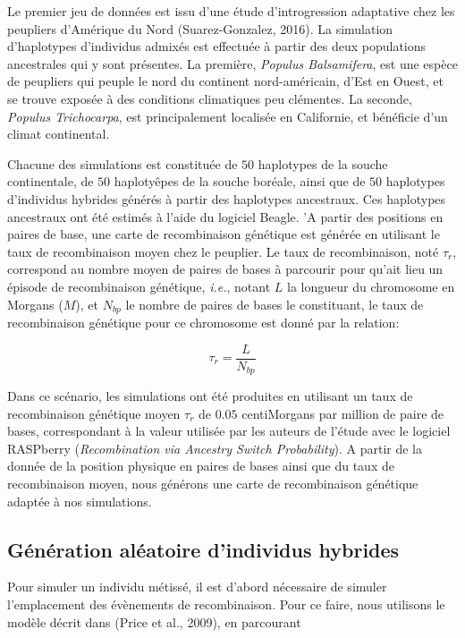 \documentclass[12pt,twoside]{reedthesis}
\begin{document}
  Le premier jeu de données est issu d'une étude d'introgression
  adaptative chez les peupliers d'Amérique du Nord (Suarez-Gonzalez,
  2016). La simulation d'haplotypes d'individus admixés est effectuée à
  partir des deux populations ancestrales qui y sont présentes. La
  première, \emph{Populus Balsamifera}, est une espèce de peupliers qui
  peuple le nord du continent nord-américain, d'Est en Ouest, et se trouve
  exposée à des conditions climatiques peu clémentes. La seconde,
  \emph{Populus Trichocarpa}, est principalement localisée en Californie,
  et bénéficie d'un climat continental.
  
  Chacune des simulations est constituée de \(50\) haplotypes de la souche
  continentale, de \(50\) haplotyêpes de la souche boréale, ainsi que de
  \(50\) haplotypes d'individus hybrides générés à partir des haplotypes
  ancestraux. Ces haplotypes ancestraux ont été estimés à l'aide du
  logiciel Beagle. 'A partir des positions en paires de base, une carte de
  recombinaison génétique est générée en utilisant le taux de
  recombinaison moyen chez le peuplier. Le taux de recombinaison, noté
  \(\tau_r\), correspond au nombre moyen de paires de bases à parcourir
  pour qu'ait lieu un épisode de recombinaison génétique, \emph{i.e.},
  notant \(L\) la longueur du chromosome en Morgans (\(M\)), et \(N_{bp}\)
  le nombre de paires de bases le constituant, le taux de recombinaison
  génétique pour ce chromosome est donné par la relation:
  
  \[\tau_r = \frac{L}{N_{bp}}\]
  
  Dans ce scénario, les simulations ont été produites en utilisant un taux
  de recombinaison génétique moyen \(\tau_r\) de \(0.05\) centiMorgans par
  million de paire de bases, correspondant à la valeur utilisée par les
  auteurs de l'étude avec le logiciel RASPberry
  (\textit{Recombination via Ancestry Switch Probability}). A partir de la
  donnée de la position physique en paires de bases ainsi que du taux de
  recombinaison moyen, nous générons une carte de recombinaison génétique
  adaptée à nos simulations.
  
  \subsection{Génération aléatoire d'individus
  hybrides}\label{generation-aleatoire-dindividus-hybrides}
  
  Pour simuler un individu métissé, il est d'abord nécessaire de simuler
  l'emplacement des évènements de recombinaison. Pour ce faire, nous
  utilisons le modèle décrit dans (Price et al., 2009), en parcourant
  
\end{document}
